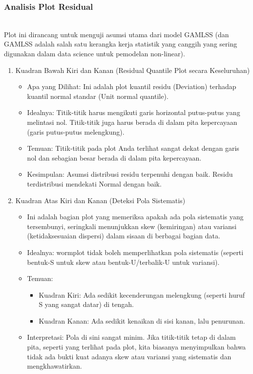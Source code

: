 \documentclass[11pt, a4paper]{article}
\begin{document}
\subsubsection{\textbf{Analisis Plot Residual}}\\
Plot ini dirancang untuk menguji asumsi utama dari model GAMLSS (dan GAMLSS adalah salah satu kerangka kerja statistik yang canggih yang sering digunakan dalam data science untuk pemodelan non-linear).
\begin{enumerate}
\item Kuadran Bawah Kiri dan Kanan (Residual Quantile Plot secara Keseluruhan)
    \begin{itemize}
    \item Apa yang Dilihat: Ini adalah plot kuantil residu (Deviation) terhadap kuantil normal standar (Unit normal quantile).
    \item Idealnya: Titik-titik harus mengikuti garis horizontal putus-putus yang melintasi nol. Titik-titik juga harus berada di dalam pita kepercayaan (garis putus-putus melengkung).
    \item Temuan: Titik-titik pada plot Anda terlihat sangat dekat dengan garis nol dan sebagian besar berada di dalam pita kepercayaan.
    \item Kesimpulan: Asumsi distribusi residu terpenuhi dengan baik. Residu terdistribusi mendekati Normal dengan baik.
    \end{itemize}
\item Kuadran Atas Kiri dan Kanan (Deteksi Pola Sistematis)
    \begin{itemize}
    \item  Ini adalah bagian plot yang memeriksa apakah ada pola sistematis yang tersembunyi, seringkali menunjukkan skew (kemiringan) atau variansi (ketidaksesuaian dispersi) dalam sisaan di berbagai bagian data.
    \item Idealnya: wormplot tidak boleh memperlihatkan pola sistematis (seperti bentuk-S untuk skew atau bentuk-U/terbalik-U untuk variansi).
    \item Temuan:
        \begin{itemize}
            \item Kuadran Kiri: Ada sedikit kecenderungan melengkung (seperti huruf S yang sangat datar) di tengah.
            \item Kuadran Kanan: Ada sedikit kenaikan di sisi kanan, lalu penurunan.
        \end{itemize}
    \item Interpretasi: Pola di sini sangat minim. Jika titik-titik tetap di dalam pita, seperti yang terlihat pada plot, kita biasanya menyimpulkan bahwa tidak ada bukti kuat adanya skew atau variansi yang sistematis dan mengkhawatirkan.

\end{itemize}
\end{enumerate}
\end{document}
